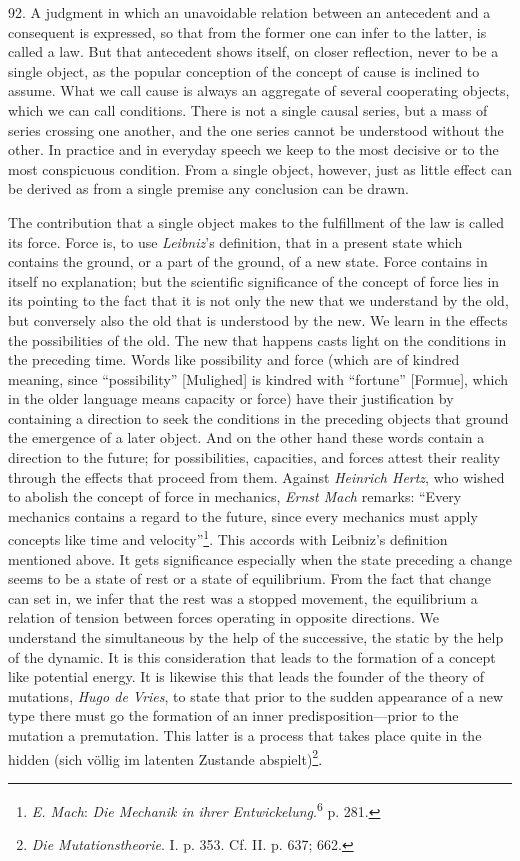 \documentclass[12pt,a4paper]{book}
\newcommand{\opage}[1]{\marginnote{\footnotesize\textit{[#1]}}}
\begin{document}
92. A judgment in which an unavoidable relation between an antecedent and a
consequent is expressed, so that from the former one can infer to the latter,
is called a law. But that antecedent shows itself, on closer reflection, never
to be a single object, as the popular conception of the concept of cause is
inclined to assume. What we call cause is always an aggregate of several
cooperating objects, which we can call conditions. There is not a single
causal series, but a mass of series crossing one another, and the one series
cannot be understood without the other. In practice and in everyday speech we
keep to the most decisive or to the most conspicuous condition. From a single
object, however, just as little effect can be derived as from a single premise
any conclusion can be drawn.

The contribution that a single object makes to the fulfillment of the law is
called its force. Force is, to use \emph{Leibniz}'s \opage{216}definition, that in a
present state which contains the ground, or a part of the ground, of a new
state. Force contains in itself no explanation; but the scientific
significance of the concept of force lies in its pointing to the fact that it
is not only the new that we understand by the old, but conversely also the old
that is understood by the new. We learn in the effects the possibilities of
the old. The new that happens casts light on the conditions in the preceding
time. Words like possibility and force (which are of kindred meaning, since
``possibility'' [Mulighed] is kindred with ``fortune'' [Formue], which in the
older language means capacity or force) have their justification by containing
a direction to seek the conditions in the preceding objects that ground the
emergence of a later object. And on the other hand these words contain a
direction to the future; for possibilities, capacities, and forces attest
their reality through the effects that proceed from them. Against
\emph{Heinrich Hertz}, who wished to abolish the concept of force in
mechanics, \emph{Ernst Mach} remarks: ``Every mechanics contains a regard to
the future, since every mechanics must apply concepts like time and
velocity''\footnote{\emph{E. Mach}: \emph{Die Mechanik in ihrer
Entwickelung}.\textsuperscript{6} p. 281.}. This accords with Leibniz's
definition mentioned above. It gets significance especially when the state
preceding a change seems to be a state of rest or a state of equilibrium. From
the fact that change can set in, we infer that the rest was a stopped
movement, the equilibrium a relation of tension between forces operating in
opposite directions. We understand the simultaneous by the help of the
successive, the static by the help of the dynamic. It is this consideration
that leads to the formation of a concept like potential energy. It is likewise
this that leads the founder of the theory of mutations, \emph{Hugo de Vries},
to state that prior to the sudden appearance of a new type there must go the
formation of an inner predisposition---prior to the mutation a premutation.
This latter is a process that takes place quite in the hidden (sich völlig im
latenten Zustande abspielt)\footnote{\emph{Die Mutationstheorie}. I. p. 353.
Cf. II. p. 637; 662.}.
\end{document}
